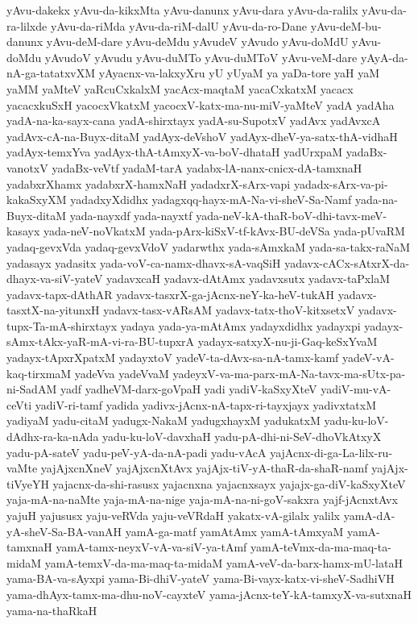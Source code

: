 {yAvu-dakekx
yAvu-da-kikxMta
yAvu-danunx
yAvu-dara
yAvu-da-ralilx
yAvu-da-ra-lilxde
yAvu-da-riMda
yAvu-da-riM-dalU
yAvu-da-ro-Dane
yAvu-deM-bu-danunx
yAvu-deM-dare
yAvu-deMdu
yAvudeV
yAvudo
yAvu-doMdU
yAvu-doMdu
yAvudoV
yAvudu
yAvu-duMTo
yAvu-duMToV
yAvu-veM-dare
yAyA-da-nA-ga-tatatxvXM
yAyacnx-va-lakxyXru
yU
yUyaM
ya
yaDa-tore
yaH
yaM
yaMM
yaMteV
yaRcuCxkalxM
yacAcx-maqtaM
yacaCxkatxM
yacacx
yacacxkuSxH
yacocxVkatxM
yacocxV-katx-ma-nu-miV-yaMteV
yadA
yadAha
yadA-na-ka-sayx-cana
yadA-shirxtayx
yadA-su-SupotxV
yadAvx
yadAvxcA
yadAvx-cA-na-Buyx-ditaM
yadAyx-deVshoV
yadAyx-dheV-ya-satx-thA-vidhaH
yadAyx-temxYva
yadAyx-thA-tAmxyX-va-boV-dhataH
yadUrxpaM
yadaBx-vanotxV
yadaBx-veVtf
yadaM-tarA
yadabx-lA-nanx-cnicx-dA-tamxnaH
yadabxrXhamx
yadabxrX-hamxNaH
yadadxrX-sArx-vapi
yadadx-sArx-va-pi-kakaSxyXM
yadadxyXdidhx
yadagxqq-hayx-mA-Na-vi-sheV-Sa-Namf
yada-na-Buyx-ditaM
yada-nayxdf
yada-nayxtf
yada-neV-kA-thaR-boV-dhi-tavx-meV-kasayx
yada-neV-noVkatxM
yada-pArx-kiSxV-tf-kAvx-BU-deVSa
yada-pUvaRM
yadaq-gevxVda
yadaq-gevxVdoV
yadarwthx
yada-sAmxkaM
yada-sa-takx-raNaM
yadasayx
yadasitx
yada-voV-ca-namx-dhavx-sA-vaqSiH
yadavx-cACx-sAtxrX-da-dhayx-va-siV-yateV
yadavxcaH
yadavx-dAtAmx
yadavxsutx
yadavx-taPxlaM
yadavx-tapx-dAthAR
yadavx-tasxrX-ga-jAcnx-neY-ka-heV-tukAH
yadavx-tasxtX-na-yitunxH
yadavx-tasx-vARsAM
yadavx-tatx-thoV-kitxsetxV
yadavx-tupx-Ta-mA-shirxtayx
yadaya
yada-ya-mAtAmx
yadayxdidhx
yadayxpi
yadayx-sAmx-tAkx-yaR-mA-vi-ra-BU-tupxrA
yadayx-satxyX-nu-ji-Gaq-keSxYvaM
yadayx-tApxrXpatxM
yadayxtoV
yadeV-ta-dAvx-sa-nA-tamx-kamf
yadeV-vA-kaq-tirxmaM
yadeVva
yadeVvaM
yadeyxV-va-ma-parx-mA-Na-tavx-ma-sUtx-pa-ni-SadAM
yadf
yadheVM-darx-goVpaH
yadi
yadiV-kaSxyXteV
yadiV-mu-vA-ceVti
yadiV-ri-tamf
yadida
yadivx-jAcnx-nA-tapx-ri-tayxjayx
yadivxtatxM
yadiyaM
yadu-citaM
yadugx-NakaM
yadugxhayxM
yadukatxM
yadu-ku-loV-dAdhx-ra-ka-nAda
yadu-ku-loV-davxhaH
yadu-pA-dhi-ni-SeV-dhoVkAtxyX
yadu-pA-sateV
yadu-peV-yA-da-nA-padi
yadu-vAcA
yajAcnx-di-ga-La-lilx-ru-vaMte
yajAjxcnXneV
yajAjxcnXtAvx
yajAjx-tiV-yA-thaR-da-shaR-namf
yajAjx-tiVyeYH
yajacnx-da-shi-rasusx
yajacnxna
yajacnxsayx
yajajx-ga-diV-kaSxyXteV
yaja-mA-na-naMte
yaja-mA-na-nige
yaja-mA-na-ni-goV-sakxra
yajf-jAcnxtAvx
yajuH
yajususx
yaju-veRVda
yaju-veVRdaH
yakatx-vA-gilalx
yalilx
yamA-dA-yA-sheV-Sa-BA-vanAH
yamA-ga-matf
yamAtAmx
yamA-tAmxyaM
yamA-tamxnaH
yamA-tamx-neyxV-vA-va-siV-ya-tAmf
yamA-teVmx-da-ma-maq-ta-midaM
yamA-temxV-da-ma-maq-ta-midaM
yamA-veV-da-barx-hamx-mU-lataH
yama-BA-va-sAyxpi
yama-Bi-dhiV-yateV
yama-Bi-vayx-katx-vi-sheV-SadhiVH
yama-dhAyx-tamx-ma-dhu-noV-cayxteV
yama-jAcnx-teY-kA-tamxyX-va-sutxnaH
yama-na-thaRkaH
}
